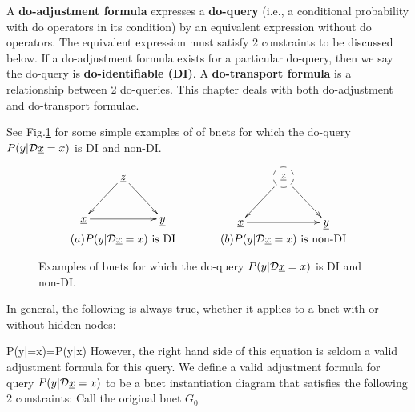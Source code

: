 A {\bf do-adjustment 
formula} expresses
a {\bf do-query} (i.e., 
a conditional probability
with do operators
in its condition) by
an equivalent expression
without do operators.
The equivalent expression must 
satisfy 2 constraints
to be discussed  below.
If a do-adjustment formula
exists for a
particular do-query, 
then we say the do-query is
 {\bf do-identifiable (DI)}.
A {\bf do-transport formula}
is a relationship between 2  do-queries.
This chapter deals with both
do-adjustment and do-transport
formulae.

See Fig.\ref{fig-iden-noniden}
for some simple
examples of of 
bnets for which
the do-query $P(y|{\cal D}{\underline{x}}=x)$
is
DI
and non-DI.

\begin{figure}[h!]
$$
\begin{array}{ccc}
\xymatrix{
&\rvz\ar[ld]\ar[rd]
\\
\rvx\ar[rr]&&\rvy
}
&\quad\quad&
\xymatrix{
&*++[F-o]{\rvz}\ar[ld]\ar[rd]
\\
\rvx\ar[rr]&&\rvy
}
\\
(a) \text{$P(y|\cald\rvx=x)$ is DI}
&&(b) \text{$P(y|\cald\rvx=x)$ is non-DI}
\end{array}
$$
\caption{Examples of 
bnets for which
the do-query $P(y|{\cal D}{\underline{x}}=x)$
is
DI
and non-DI.
}
\label{fig-iden-noniden}
\end{figure}

In general, the
following is always true,
whether it applies to a bnet
with or without hidden nodes:

\beq
P(y|\cald\rvx=x)=P(y|x)
\eeq
However, the right hand side of this equation is 
seldom a valid adjustment formula
for this query.
We define a valid adjustment formula
for query
$P(y|{\cal D}{\underline{x}}=x)$
to be a bnet instantiation diagram
that satisfies the
following 2 constraints:
Call the original bnet $G_0$

